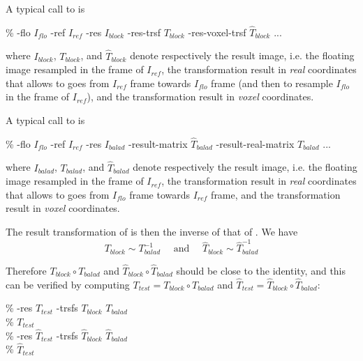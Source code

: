 A typical call to \blockmatching is
\begin{code}{0.8}
\% \blockmatching -flo $I_{flo}$ -ref $I_{ref}$ -res $I_{block}$ 
   -res-trsf $T_{block}$ -res-voxel-trsf $\hat{T}_{block}$ ...
\end{code}
where $I_{block}$, $T_{block}$, and $\hat{T}_{block}$ denote respectively the result image, i.e. the floating image resampled in the frame of $I_{ref}$, the transformation result in \textit{real} coordinates that allows to goes from $I_{ref}$ frame towards $I_{flo}$ frame (and then to resample $I_{flo}$ in the frame of $I_{ref}$), and the transformation result in \textit{voxel} coordinates.

A typical call to \baladin is
\begin{code}{0.8}
\% \baladin -flo $I_{flo}$ -ref $I_{ref}$ -res $I_{balad}$ 
-result-matrix $\hat{T}_{balad}$ -result-real-matrix $T_{balad}$ ...
\end{code}
where $I_{balad}$, $T_{balad}$, and $\hat{T}_{balad}$ denote respectively the result image, i.e. the floating image resampled in the frame of $I_{ref}$, the transformation result in \textit{real} coordinates that allows to goes from $I_{flo}$ frame towards $I_{ref}$ frame, and the transformation result in \textit{voxel} coordinates.

\begin{attention} The result transformation of \baladin is then the inverse of that of \blockmatching. We have 
$$ T_{block} \sim T^{-1}_{balad} \quad \mbox{ and } \quad \hat{T}_{block} \sim \hat{T}^{-1}_{balad}
$$
\end{attention}

Therefore $T_{block} \circ T_{balad}$ and $\hat{T}_{block} \circ \hat{T}_{balad}$ should be close to the identity, and this can be verified by computing $T_{test} = T_{block} \circ T_{balad}$
and $\hat{T}_{test} = \hat{T}_{block} \circ \hat{T}_{balad}$:
\begin{code}{0.8}
\% \composeTrsf -res $T_{test}$ -trsfs $T_{block}$ $T_{balad}$ \\
\% \printTrsf $T_{test}$\\
\% \composeTrsf -res $\hat{T}_{test}$ -trsfs $\hat{T}_{block}$ $\hat{T}_{balad}$\\
\% \printTrsf $\hat{T}_{test}$
\end{code}

